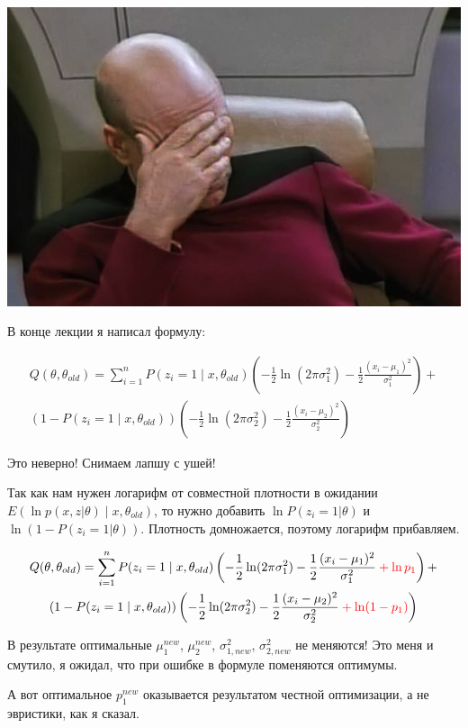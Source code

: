 \documentclass[12pt]{article}
\begin{document}
 
\includegraphics[scale=0.8]{CaptainFacepalm.png}

В конце лекции я написал формулу:

\begin{multline}
 Q(\theta, \theta_{old}) = 
 \sum_{i=1}^n P(z_i = 1\mid x, \theta_{old}) \left( -\frac{1}{2}\ln(2\pi\sigma_1^2) - \frac{1}{2}\frac{(x_i - \mu_1)^2}{\sigma_1^2} \right) + \\ 
 (1- P(z_i = 1\mid x, \theta_{old})) \left( -\frac{1}{2}\ln(2\pi\sigma_2^2) - \frac{1}{2}\frac{(x_i - \mu_2)^2}{\sigma_2^2} \right)
\end{multline}


Это неверно! Снимаем лапшу с ушей!

Так как нам нужен логарифм от совместной плотности в ожидании $E(\ln p(x,z|\theta)\mid x, \theta_{old})$, 
то нужно добавить $\ln P(z_i = 1|\theta)$ и $\ln (1 - P(z_i = 1|\theta))$. Плотность домножается, поэтому логарифм прибавляем.

\begin{multline}
 Q(\theta, \theta_{old}) = 
 \sum_{i=1}^n P(z_i = 1\mid x, \theta_{old}) \left( -\frac{1}{2}\ln(2\pi\sigma_1^2) - \frac{1}{2}\frac{(x_i - \mu_1)^2}{\sigma_1^2}  \color{red}+ \ln p_1 \color{black}\right) + \\ 
 (1- P(z_i = 1\mid x, \theta_{old})) \left( -\frac{1}{2}\ln(2\pi\sigma_2^2) - \frac{1}{2}\frac{(x_i - \mu_2)^2}{\sigma_2^2} \color{red}+ \ln (1- p_1) \color{black}\right)
\end{multline}
   

В результате оптимальные $\mu_1^{new}$, $\mu_2^{new}$, $\sigma^2_{1,new}$, $\sigma^2_{2,new}$ не меняются! 
Это меня и смутило, я ожидал, что при ошибке в формуле поменяются оптимумы.

А вот оптимальное $p_1^{new}$ оказывается результатом честной оптимизации, а не эвристики, как я сказал.
\end{document}
